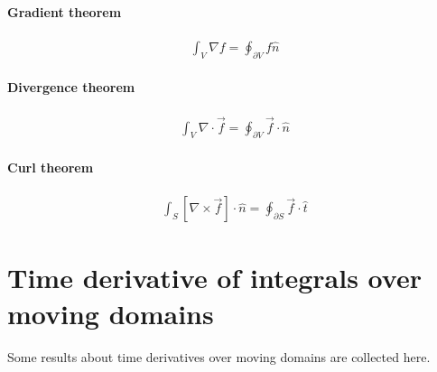 \documentclass[letterpaper,10pt,english]{jupyterBook}
\begin{document}
\subsubsection{Gradient theorem}
\label{\detokenize{ch/tensor-algebra-calculus/calculus-euclidean:gradient-theorem}}\label{\detokenize{ch/tensor-algebra-calculus/calculus-euclidean:tensor-calculus-integrals-theorems-gradient}}\begin{equation*}
\begin{split}\int_{V} \nabla f = \oint_{\partial V} f \hat{n}\end{split}
\end{equation*}

\subsubsection{Divergence theorem}
\label{\detokenize{ch/tensor-algebra-calculus/calculus-euclidean:divergence-theorem}}\label{\detokenize{ch/tensor-algebra-calculus/calculus-euclidean:tensor-calculus-integrals-theorems-divergence}}\begin{equation*}
\begin{split}\int_{V} \nabla \cdot \vec{f} = \oint_{\partial V} \vec{f} \cdot \hat{n}\end{split}
\end{equation*}

\subsubsection{Curl theorem}
\label{\detokenize{ch/tensor-algebra-calculus/calculus-euclidean:curl-theorem}}\label{\detokenize{ch/tensor-algebra-calculus/calculus-euclidean:tensor-calculus-integrals-theorems-curl}}\begin{equation*}
\begin{split}\int_{S} \left[ \nabla \times \vec{f} \right] \cdot \hat{n} = \oint_{\partial S} \vec{f} \cdot \hat{t}\end{split}
\end{equation*}
\sphinxstepscope


\chapter{Time derivative of integrals over moving domains}
\label{\detokenize{ch/tensor-algebra-calculus/time-derivative-of-integrals:time-derivative-of-integrals-over-moving-domains}}\label{\detokenize{ch/tensor-algebra-calculus/time-derivative-of-integrals:tensor-calculus-time-derivative-of-integrals}}\label{\detokenize{ch/tensor-algebra-calculus/time-derivative-of-integrals::doc}}
\sphinxAtStartPar
Some results about time derivatives over moving domains are collected here.
\end{document}

